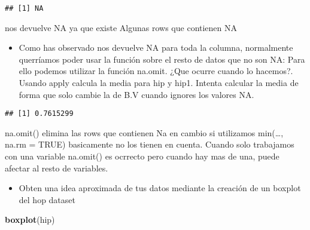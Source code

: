 \documentclass[]{article}
\newenvironment{Shaded}{\begin{snugshade}}{\end{snugshade}}
\newcommand{\KeywordTok}[1]{\textcolor[rgb]{0.13,0.29,0.53}{\textbf{#1}}}
\newcommand{\StringTok}[1]{\textcolor[rgb]{0.31,0.60,0.02}{#1}}
\newcommand{\OperatorTok}[1]{\textcolor[rgb]{0.81,0.36,0.00}{\textbf{#1}}}
\newcommand{\NormalTok}[1]{#1}
\providecommand{\tightlist}{%
  \setlength{\itemsep}{0pt}\setlength{\parskip}{0pt}}
\begin{document}
\begin{Shaded}
\end{Shaded}

\begin{verbatim}
## [1] NA
\end{verbatim}

nos devuelve NA ya que existe Algunas rows que contienen NA

\begin{itemize}
\tightlist
\item
  Como has observado nos devuelve NA para toda la columna, normalmente
  querríamos poder usar la función sobre el resto de datos que no son
  NA: Para ello podemos utilizar la función na.omit. ¿Que ocurre cuando
  lo hacemos?. Usando apply calcula la media para hip y hip1. Intenta
  calcular la media de forma que solo cambie la de B.V cuando ignores
  los valores NA.
\end{itemize}

\begin{Shaded}
\end{Shaded}

\begin{verbatim}
## [1] 0.7615299
\end{verbatim}

na.omit() elimina las rows que contienen Na en cambio si utilizamos
min(\ldots{}, na.rm = TRUE) basicamente no los tienen en cuenta. Cuando
solo trabajamos con una variable na.omit() es ocrrecto pero cuando hay
mas de una, puede afectar al resto de variables.

\begin{itemize}
\tightlist
\item
  Obten una idea aproximada de tus datos mediante la creación de un
  boxplot del hop dataset
\end{itemize}

\begin{Shaded}
\begin{Highlighting}[]
\KeywordTok{boxplot}\NormalTok{(hip)}
\end{Highlighting}
\end{Shaded}
\end{document}
